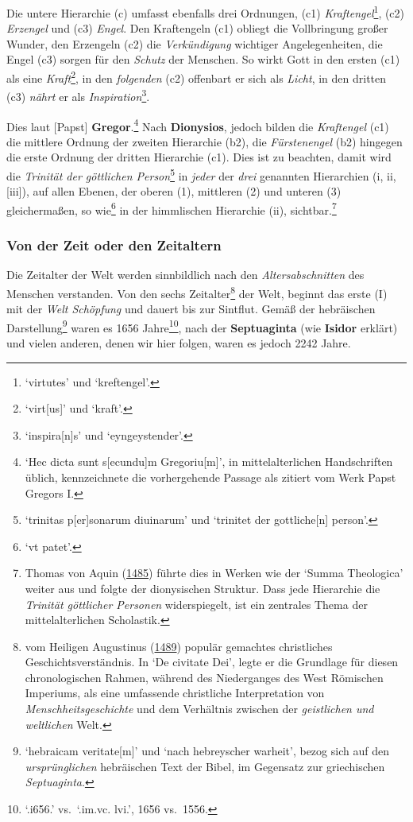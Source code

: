 \documentclass[
]{article}
\begin{document}
Die untere Hierarchie (c) umfasst ebenfalls drei Ordnungen, (c1)
\emph{Kraftengel}\footnote{`virtutes' und `kreftengel'.}, (c2)
\emph{Erzengel} und (c3) \emph{Engel}. Den Kraftengeln (c1) obliegt die
Vollbringung großer Wunder, den Erzengeln (c2) die \emph{Verkündigung}
wichtiger Angelegenheiten, die Engel (c3) sorgen für den \emph{Schutz}
der Menschen. So wirkt Gott in den ersten (c1) als eine
\emph{Kraft}\footnote{`virt{[}us{]}' und `kraft'.}, in den
\emph{folgenden} (c2) offenbart er sich als \emph{Licht}, in den dritten
(c3) \emph{nährt} er als \emph{Inspiration}\footnote{`inspira{[}n{]}s'
  und `eyngeystender'.}.

Dies laut {[}Papst{]} \textbf{Gregor}.\footnote{`Hec dicta sunt
  s{[}ecundu{]}m Gregoriu{[}m{]}', in mittelalterlichen Handschriften
  üblich, kennzeichnete die vorhergehende Passage als zitiert vom Werk
  Papst Gregors I.} Nach \textbf{Dionysios}, jedoch bilden die
\emph{Kraftengel} (c1) die mittlere Ordnung der zweiten Hierarchie (b2),
die \emph{Fürstenengel} (b2) hingegen die erste Ordnung der dritten
Hierarchie (c1). Dies ist zu beachten, damit wird die \emph{Trinität der
göttlichen Person}\footnote{`trinitas p{[}er{]}sonarum diuinarum' und
  `trinitet der gottliche{[}n{]} person'.} in \emph{jeder} der
\emph{drei} genannten Hierarchien (i, ii, {[}iii{]}), auf allen Ebenen,
der oberen (1), mittleren (2) und unteren (3) gleichermaßen, so
wie\footnote{`vt patet'.} in der himmlischen Hierarchie (ii),
sichtbar.\footnote{Thomas von Aquin
  (\href{https://doi.org/10.3931/e-rara-15170}{1485}) führte dies in
  Werken wie der `Summa Theologica' weiter aus und folgte der
  dionysischen Struktur. Dass jede Hierarchie die \emph{Trinität
  göttlicher Personen} widerspiegelt, ist ein zentrales Thema der
  mittelalterlichen Scholastik.}

\hypertarget{von-der-zeit-oder-den-zeitaltern}{%
\subsubsection{Von der Zeit oder den
Zeitaltern}\label{von-der-zeit-oder-den-zeitaltern}}

Die Zeitalter der Welt werden sinnbildlich nach den
\emph{Altersabschnitten} des Menschen verstanden. Von den sechs
Zeitalter\footnote{vom Heiligen Augustinus
  (\href{https://doi.org/10.3931/e-rara-12425}{1489}) populär gemachtes
  christliches Geschichtsverständnis. In `De civitate Dei', legte er die
  Grundlage für diesen chronologischen Rahmen, während des Niederganges
  des West Römischen Imperiums, als eine umfassende christliche
  Interpretation von \emph{Menschheitsgeschichte} und dem Verhältnis
  zwischen der \emph{geistlichen und weltlichen} Welt.} der Welt,
beginnt das erste (I) mit der \emph{Welt Schöpfung} und dauert bis zur
Sintflut. Gemäß der hebräischen Darstellung\footnote{`hebraicam
  veritate{[}m{]}' und `nach hebreyscher warheit', bezog sich auf den
  \emph{ursprünglichen} hebräischen Text der Bibel, im Gegensatz zur
  griechischen \emph{Septuaginta}.} waren es 1656 Jahre\footnote{`.i656.'
  vs.~`.im.vc. lvi.', 1656 vs.~1556.}, nach der \textbf{Septuaginta}
(wie \textbf{Isidor} erklärt) und vielen anderen, denen wir hier folgen,
waren es jedoch 2242 Jahre.
\end{document}
